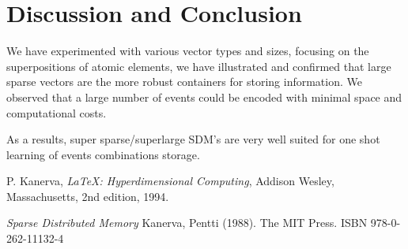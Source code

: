 \documentclass[11pt]{article}
\begin{document}
\section{Discussion and Conclusion}
We have experimented with various 
vector types and sizes, focusing on the superpositions of atomic elements, we have illustrated and confirmed that large sparse vectors are the more robust containers for storing information. We observed that a large number of events could be encoded with minimal space and computational costs.

 As a results, super sparse/superlarge SDM's are very well suited for one shot learning of events combinations storage. 




\begin{thebibliography}{9}

  P. Kanerva,
  \textit{\LaTeX: Hyperdimensional Computing},
  Addison Wesley, Massachusetts,
  2nd edition,
  1994.
 

 \textit{Sparse Distributed Memory}
 Kanerva, Pentti (1988).  The MIT Press. ISBN 978-0-262-11132-4

\end{thebibliography}
\end{document}
